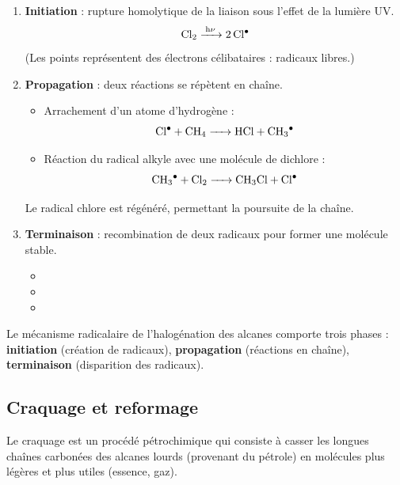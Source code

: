 \begin{enumerate}
    \item \textbf{Initiation} : rupture homolytique de la liaison  sous l'effet de la lumière UV.
    \[
    \ce{Cl2 ->[h\nu] 2 Cl$^{\bullet}$}
    \]
    (Les points représentent des électrons célibataires : radicaux libres.)
    
    \item \textbf{Propagation} : deux réactions se répètent en chaîne.
    \begin{itemize}
        \item Arrachement d'un atome d'hydrogène :
        \[
        \ce{Cl$^{\bullet}$ + CH4 -> HCl + CH3$^{\bullet}$}
        \]
        \item Réaction du radical alkyle avec une molécule de dichlore :
        \[
        \ce{CH3$^{\bullet}$ + Cl2 -> CH3Cl + Cl$^{\bullet}$}
        \]
    \end{itemize}
    Le radical chlore  est régénéré, permettant la poursuite de la chaîne.
    
    \item \textbf{Terminaison} : recombination de deux radicaux pour former une molécule stable.
    \begin{itemize}
        \item {}
        \item {}
        \item {}
    \end{itemize}
\end{enumerate}

\begin{aretenir}
Le mécanisme radicalaire de l'halogénation des alcanes comporte trois phases : \textbf{initiation} (création de radicaux), \textbf{propagation} (réactions en chaîne), \textbf{terminaison} (disparition des radicaux).
\end{aretenir}

\subsection{Craquage et reformage}

\begin{definition}[Craquage]
Le craquage est un procédé pétrochimique qui consiste à casser les longues chaînes carbonées des alcanes lourds (provenant du pétrole) en molécules plus légères et plus utiles (essence, gaz).
\end{definition}

